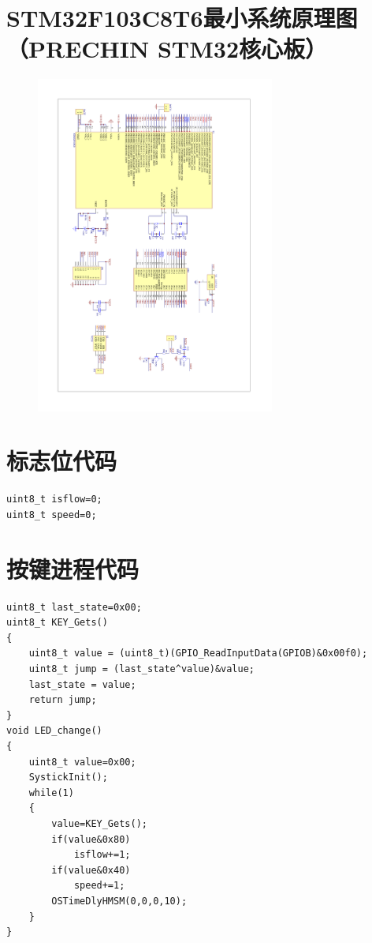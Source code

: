 \documentclass[a4paper]{ctexart}
\begin{document}
\section{STM32F103C8T6最小系统原理图（PRECHIN STM32核心板）}\label{apdx:最小系统原理图}
\begin{figure}[htbp]
	\centering
	\includegraphics[width=0.7\textwidth]{figure/STM32.pdf}
\end{figure}
\newpage

\section{标志位代码}\label{标志位代码}
\begin{lstlisting}
uint8_t isflow=0;
uint8_t speed=0;
\end{lstlisting}

\section{按键进程代码}\label{按键进程代码}
\begin{lstlisting}
uint8_t last_state=0x00;
uint8_t KEY_Gets()
{
	uint8_t value = (uint8_t)(GPIO_ReadInputData(GPIOB)&0x00f0);
	uint8_t jump = (last_state^value)&value;
	last_state = value;
	return jump;
}
void LED_change()
{
	uint8_t value=0x00;
	SystickInit();
	while(1)
	{
		value=KEY_Gets();
		if(value&0x80)
			isflow+=1;
		if(value&0x40)
			speed+=1;
		OSTimeDlyHMSM(0,0,0,10);
	}
}
\end{lstlisting}
\end{document}
